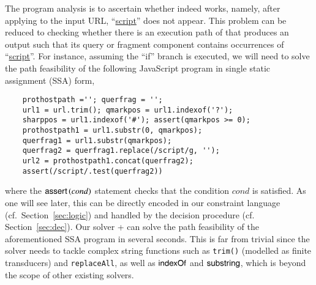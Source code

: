 

The program analysis is to ascertain whether {\urlxsssanitise} indeed works, namely, after applying {\urlxsssanitise} to the input URL, ``\url{script}'' does not appear.  This problem can be reduced to checking whether there is an execution path of {\urlxsssanitise} that produces an output such that its query or fragment component contains occurrences of ``\url{script}''. For instance, assuming  the ``if'' branch is executed, %
we will need to solve the path feasibility of the following JavaScript program in single static assignment (SSA) form,
%
{\small
\begin{verbatim}
    prothostpath =''; querfrag = '';
    url1 = url.trim(); qmarkpos = url1.indexof('?');
    sharppos = url1.indexof('#'); assert(qmarkpos >= 0); 
    prothostpath1 = url1.substr(0, qmarkpos);
    querfrag1 = url1.substr(qmarkpos);
    querfrag2 = querfrag1.replace(/script/g, '');
    url2 = prothostpath1.concat(querfrag2);
    assert(/script/.test(querfrag2))
\end{verbatim}
}
\noindent where the $\textsf{assert}\left(cond\right)$ statement checks that the condition $cond$ is satisfied. As one will see later, this can be directly encoded in our constraint language (cf.\ Section~\ref{sec:logic}) and handled by the decision procedure (cf. Section~\ref{sec:dec}). 
Our solver  {\ostrich}+ can solve the path feasibility of the aforementioned 
SSA program in several seconds. This is far from trivial since %
the solver needs to tackle complex string functions such as {\tt trim()} (modelled as finite transducers) and {\tt replaceAll}, %
as well as %
$\mathsf{indexOf}$  and $\mathsf{substring}$, which is beyond the scope of other existing solvers.  
